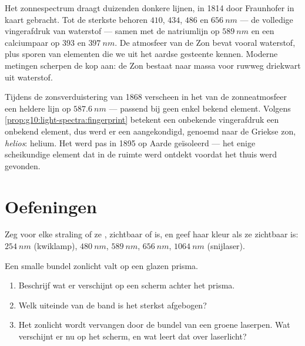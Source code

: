 \begin{example}\label{ex:g10:light-spectra:sunrecipe}
Het zonnespectrum draagt duizenden donkere lijnen, in 1814 door
Fraunhofer in kaart gebracht. Tot de sterkste behoren $410$, $434$, $486$
en $\qty{656}{nm}$ --- de volledige vingerafdruk van waterstof ---
samen met de natriumlijn op $\qty{589}{nm}$ en een calciumpaar op $393$
en $\qty{397}{nm}$. De atmosfeer van de Zon bevat vooral waterstof, plus
sporen van elementen die we uit het aardse gesteente kennen. Moderne
metingen scherpen de kop aan: de Zon bestaat naar massa voor ruwweg
driekwart uit waterstof.
\end{example}

\begin{remark}\label{rem:g10:light-spectra:helium}
Tijdens de zonsverduistering van 1868 verscheen in het  van de
zonneatmosfeer een heldere lijn op $\qty{587.6}{nm}$ --- passend bij geen
enkel bekend element. Volgens
\cref{prop:g10:light-spectra:fingerprint} betekent een onbekende
vingerafdruk een onbekend element, dus werd er een aangekondigd, genoemd
naar de Griekse zon, \emph{helios}: helium. Het werd pas in 1895 op Aarde
geïsoleerd --- het enige scheikundige element dat in de ruimte werd
ontdekt voordat het thuis werd gevonden.
\end{remark}

\section{Oefeningen}

\begin{exercise}[$\star$]\label{exo:g10:light-spectra:1}
Zeg voor elke straling of ze , zichtbaar of  is, en
geef haar kleur als ze zichtbaar is: $\qty{254}{nm}$ (kwiklamp),
$\qty{480}{nm}$, $\qty{589}{nm}$, $\qty{656}{nm}$, $\qty{1064}{nm}$
(snijlaser).
\end{exercise}

\begin{exercise}[$\star$]\label{exo:g10:light-spectra:2}
Een smalle bundel zonlicht valt op een glazen prisma.
\begin{enumerate}
  \item Beschrijf wat er verschijnt op een scherm achter het prisma.
  \item Welk uiteinde van de band is het sterkst afgebogen?
  \item Het zonlicht wordt vervangen door de bundel van een groene
        laserpen. Wat verschijnt er nu op het scherm, en wat leert dat
        over laserlicht?
\end{enumerate}
\end{exercise}

